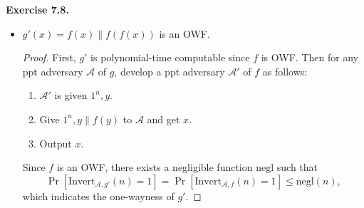 \documentclass[a4paper]{article}
\newtheorem{construction}{Construction}
\newtheorem*{proof}{Proof}
\newenvironment{exercise}[1]{
	\par
	\noindent\textbf{Exercise #1.}\quad
}{
	\par
	\bigskip
}
\newcommand{\sbra}[1]{\left[ #1 \right]}
\newcommand{\Invert}{\mathrm{Invert}}
\newcommand{\negl}{\mathrm{negl}}
\newcommand{\ppt}{{\sc ppt} }
\newcommand{\Acal}{\mathcal{A}}
\begin{document}
\begin{exercise}{7.8}
\begin{itemize}
\begin{construction}
            However, $g(x)=f(f(x))\equiv 00$, hence $g$ is not an OWF.
        \end{construction}
    \item $g'(x)=f(x)\|f(f(x))$ is an OWF.
        \begin{proof}
            First, $g'$ is polynomial-time computable since $f$ is OWF.
            Then for any \ppt adversary $\Acal$ of $g$, develop a \ppt adversary $\Acal'$ of $f$ as follows:
            \begin{enumerate}
                \item $\Acal'$ is given $1^n,y$.
                \item Give $1^n,y\|f(y)$ to $\Acal$ and get $x$.
                \item Output $x$.
            \end{enumerate}
            Since $f$ is an OWF, there exists a negligible function $\negl$ such that
            $$
            \Pr\sbra{\Invert_{\Acal,g'}(n)=1}=
            \Pr\sbra{\Invert_{\Acal,f}(n)=1}\leq\negl(n),
            $$
            which indicates the one-wayness of $g'$.
        \end{proof}
\end{itemize}
\end{exercise}
\end{document}
